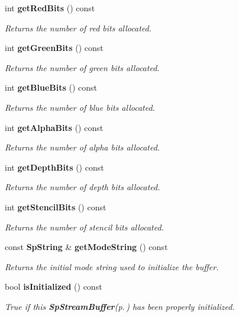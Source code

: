 \begin{CompactItemize}
int {\bf get\-Red\-Bits} () const
\begin{CompactList}\small\item\em Returns the number of red bits allocated. \item\end{CompactList}\item 
int {\bf get\-Green\-Bits} () const
\begin{CompactList}\small\item\em Returns the number of green bits allocated. \item\end{CompactList}\item 
int {\bf get\-Blue\-Bits} () const
\begin{CompactList}\small\item\em Returns the number of blue bits allocated. \item\end{CompactList}\item 
int {\bf get\-Alpha\-Bits} () const
\begin{CompactList}\small\item\em Returns the number of alpha bits allocated. \item\end{CompactList}\item 
int {\bf get\-Depth\-Bits} () const
\begin{CompactList}\small\item\em Returns the number of depth bits allocated. \item\end{CompactList}\item 
int {\bf get\-Stencil\-Bits} () const
\begin{CompactList}\small\item\em Returns the number of stencil bits allocated. \item\end{CompactList}\item 
const {\bf Sp\-String} \& {\bf get\-Mode\-String} () const
\begin{CompactList}\small\item\em Returns the initial mode string used to initialize the buffer. \item\end{CompactList}\item 
bool {\bf is\-Initialized} () const
\begin{CompactList}\small\item\em True if this {\bf Sp\-Stream\-Buffer}{\rm (p.\,\pageref{classSpark_1_1SpStreamBuffer})} has been properly initialized. \item\end{CompactList}\item 

\end{CompactItemize}
